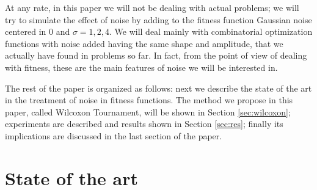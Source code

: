 \documentclass{llncs}
\begin{document}
At any rate, in this paper we will not be dealing with actual
problems; we will try to simulate the effect of noise by adding to the fitness function Gaussian noise centered in 0 and $\sigma=1,2,4$. We will deal mainly with combinatorial optimization functions with noise added having the same shape and amplitude,
that we actually have found in problems so far. In fact, from the
point of view of dealing with fitness, these are the main features of
noise we will be interested in. 


The rest of the paper is organized as follows: next we describe the
state of the art in the treatment of noise in fitness functions. The
method we propose in this paper, called Wilcoxon Tournament, will be
shown in Section \ref{sec:wilcoxon}; experiments are described and
results shown in Section \ref{sec:res}; finally its implications are discussed in the last section of the paper. 


\section{State of the art}
\label{sec:soa}
\end{document}
